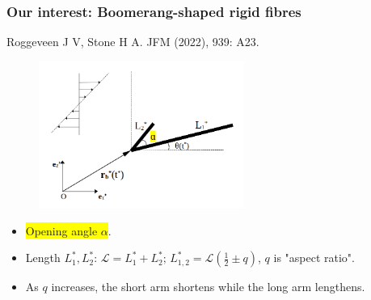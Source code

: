 \documentclass{beamer}
\newcommand{\bi}{\begin{itemize}}
\newcommand{\ei}{\end{itemize}}
\begin{document}
\begin{frame}
	\frametitle{Our interest: Boomerang-shaped rigid fibres}
	\begin{overlayarea}{\textwidth}{\textheight}
		\vspace{-0.5cm}\footnotesize Roggeveen J V, Stone H A. JFM (2022), 939: A23.\vspace{-0.2cm}
		\begin{figure}[htb]
			\begin{center}
				\includegraphics[width=0.6\textwidth]{plots/schematic/schematic_rigid_configuration_alpha.png}
			\end{center}
		\end{figure}\vspace{-0.3cm}
		\small \bi
		\item \colorbox{yellow}{Opening angle $\alpha$}. 
		\item Length $L_1^*,L_2^*$: $\mathcal{L}=L_1^*+L_2^*;\, L_{1,2}^*=\mathcal{L}(\frac{1}{2}\pm q)$, $q$ is "aspect ratio".
		\item As $q$ increases, the short arm shortens while the long arm lengthens.
		\ei 
	\end{overlayarea}
\end{frame}


\end{document}
